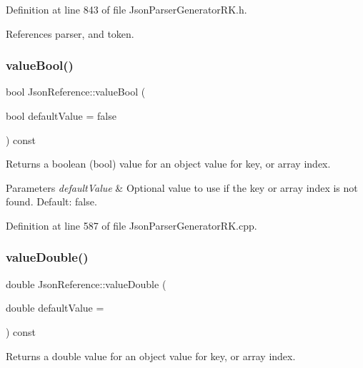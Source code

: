 Definition at line 843 of file Json\+Parser\+Generator\+R\+K.\+h.



References parser, and token.

\mbox{\label{class_json_reference_a45d8e15942d4f3cf79e6e7d0c9218acf}} 
\subsubsection{\texorpdfstring{value\+Bool()}{valueBool()}}
{\footnotesize\ttfamily bool Json\+Reference\+::value\+Bool (\begin{DoxyParamCaption}\item[{bool}]{default\+Value = {\ttfamily false} }\end{DoxyParamCaption}) const}



Returns a boolean (bool) value for an object value for key, or array index. 


\begin{DoxyParams}{Parameters}
{\em default\+Value} & Optional value to use if the key or array index is not found. Default\+: false. \\
\hline
\end{DoxyParams}


Definition at line 587 of file Json\+Parser\+Generator\+R\+K.\+cpp.

\mbox{\label{class_json_reference_a670c3313ff8bc1399ce0a6efdad3b0db}} 
\subsubsection{\texorpdfstring{value\+Double()}{valueDouble()}}
{\footnotesize\ttfamily double Json\+Reference\+::value\+Double (\begin{DoxyParamCaption}\item[{double}]{default\+Value = {} }\end{DoxyParamCaption}) const}



Returns a double value for an object value for key, or array index. 


